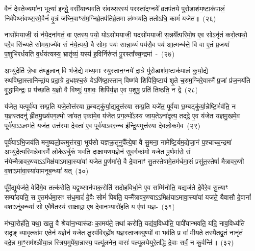 वैनं॑ दे॒वते॒ज्यमा॑ना॒ भूत्या॑ इन्द्धे॒ वसी॑यान्भवति संवथ्स॒रस्य॑ प॒रस्ता॑\-द॒ग्नये᳚ व्र॒तप॑तये पुरो॒डाश॑\-म॒ष्टा\-क॑पालं॒ निर्व॑पेथ्संवथ्स॒रमे॒वैनं॑ वृ॒त्रं ज॑घ्नि॒वाꣳस॑म॒ग्निर्व्र॒तप॑तिर्व्र॒तमा ल॑म्भयति॒ ततो\-ऽधि॒ कामं॑ यजेत॥~(२६)\ip

{\anuvakamend[{ए॒तान्तदौदु॑म्बर॒ꣴ॒ स्वा त्रि॒ꣳ॒शच्च॑}]}

नासो॑मयाजी॒ सं न॑ये॒दना॑गतं॒ वा ए॒तस्य॒ पयो॒ यो\-ऽसो॑मयाजी॒ यदसो॑मयाजी स॒न्नये᳚त्परिमो॒ष ए॒व सो\-ऽनृ॑तं करो॒त्यथो॒ परै॒व सि॑च्यते सोमया॒ज्ये॑व सं न॑ये॒त्पयो॒ वै सोमः॒ पयः॑ सान्ना॒य्यं पय॑सै॒व पय॑ आ॒त्मन्ध॑त्ते॒ वि वा ए॒तं प्र॒जया॑ प॒शुभि॑रर्धयति व॒र्धय॑त्यस्य॒ भ्रातृ॑व्यं॒ यस्य॑ ह॒विर्निरु॑प्तं पु॒रस्ता᳚च्च॒न्द्रमा॑~-~(२७)\ip

अ॒भ्यु॑देति॑ त्रे॒धा त॑ण्डु॒लान् वि भ॑जे॒द्ये म॑ध्य॒माः स्युस्तान॒ग्नये॑ दा॒त्रे पु॑रो॒डाश॑म॒ष्टाक॑पालं कुर्या॒द्ये स्थवि॑ष्ठा॒स्तानिन्द्रा॑य प्रदा॒त्रे द॒धꣴश्च॒रुं ये\-ऽणि॑ष्ठा॒स्तान् विष्ण॑वे शिपिवि॒ष्टाय॑ शृ॒ते च॒रुम॒ग्निरे॒वास्मै᳚ प्र॒जां प्र॑ज॒नय॑ति वृ॒द्धामिन्द्रः॒ प्र य॑च्छति य॒ज्ञो वै विष्णुः॑ प॒शवः॒ शिपि॑र्य॒ज्ञ ए॒व प॒शुषु॒ प्रति॑ तिष्ठति॒ न द्वे~(२८)\ip

य॑जेत॒ यत्पूर्व॑या सम्प्र॒ति यजे॒तोत्त॑रया छ॒म्बट्कु॑र्या॒द्यदुत्त॑रया सम्प्र॒ति यजे॑त॒ पूर्व॑या छ॒म्बट्कु॑र्या॒न्नेष्टि॒र्भव॑ति॒ न य॒ज्ञस्तदनु॑ ह्रीतमु॒ख्य॑पग॒ल्भो जा॑यत॒ एका॑मे॒व य॑जेत प्रग॒ल्भो᳚\-ऽस्य जाय॒ते\-ऽना॑दृत्य॒ तद्द्वे ए॒व य॑जेत यज्ञमु॒खमे॒व पूर्व॑या॒\-ऽऽ\-लभ॑ते॒ यज॑त॒ उत्त॑रया दे॒वता॑ ए॒व पूर्व॑या\-ऽवरु॒न्ध इ॑न्द्रि॒यमुत्त॑रया देवलो॒कमे॒व~(२९)\ip

पूर्व॑या\-ऽभि॒जय॑ति मनुष्यलो॒कमुत्त॑रया॒ भूय॑सो यज्ञक्र॒तूनुपै᳚त्ये॒षा वै सु॒मना॒ नामेष्टि॒र्यम॒द्येजा॒नं प॒श्चाच्च॒न्द्रमा॑ अ॒भ्यु॑देत्य॒स्मिन्ने॒वास्मै॑ लो॒के\-ऽर्धु॑कं भवति दाक्षायणय॒ज्ञेन॑ सुव॒र्गका॑मो यजेत पू॒र्णमा॑से॒ सं न॑येन्मैत्रावरु॒ण्या\-ऽऽ\-\-मिक्ष॑या\-ऽमावा॒स्या॑यां यजेत पू॒र्णमा॑से॒ वै दे॒वानाꣳ॑ सु॒तस्तेषा॑मे॒तम॑र्धमा॒सं प्रसु॑त॒स्तेषां᳚ मैत्रावरु॒णी व॒शा\-ऽमा॑वा॒स्या॑यामनूब॒न्ध्या॑ यत्~(३०)\ip

पू᳚र्वे॒द्युर्यज॑ते॒ वेदि॑मे॒व तत्क॑रोति॒ यद्व॒थ्सान॑पाक॒रोति॑ सदोहविर्धा॒ने ए॒व सम्मि॑नोति॒ यद्यज॑ते दे॒वैरे॒व सु॒त्याꣳ सम्पा॑दयति॒ स ए॒तम॑र्धमा॒सꣳ स॑ध॒मादं॑ दे॒वैः सोमं॑ पिबति॒ यन्मै᳚त्रावरु॒ण्या\-ऽऽ\-\-मिक्ष॑या\-ऽमावा॒स्या॑यां यज॑ते॒ यैवासौ दे॒वानां᳚ व॒शा\-ऽनू॑ब॒न्ध्या॑ सो ए॒वैषैतस्य॑ सा॒क्षाद्वा ए॒ष दे॒वान॒भ्यारो॑हति॒ य ए॑षां य॒ज्ञ-~(३१)\ip

म॑भ्या॒रोह॑ति॒ यथा॒ खलु॒ वै श्रेया॑न॒भ्यारू॑ढः का॒मय॑ते॒ तथा॑ करोति॒ यद्य॑व॒विध्य॑ति॒ पापी॑यान्भवति॒ यदि॒ नाव॒विध्य॑ति स॒दृङ् व्या॒वृत्का॑म ए॒तेन॑ य॒ज्ञेन॑ यजेत क्षु॒रप॑वि॒र्॒\mbox{}ह्ये॑ष य॒ज्ञस्ता॒जक्पुण्यो॑ वा॒ भव॑ति॒ प्र वा॑ मीयते॒ तस्यै॒तद्व्र॒तं नानृ॑तं वदे॒न्न मा॒ꣳ॒सम॑श्ञीया॒न्न स्त्रिय॒\-मु\-पे॑या॒न्नास्य॒ पल्पू॑लनेन॒ वासः॑ पल्पूलयेयुरे॒तद्धि दे॒वाः सर्वं॒ न कु॒र्वन्ति॑॥~(३२)\ip

